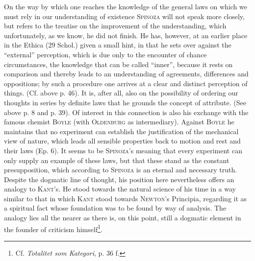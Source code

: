 \documentclass[12pt]{article}
\newcommand{\opage}[1]{\marginnote{\footnotesize\textit{[#1]}}}
\begin{document}
On the way by which one reaches the knowledge of the general laws on which we must rely in
our understanding of existence \textsc{Spinoza} will not speak more closely, but refers to
the treatise on the improvement of the understanding, which unfortunately, as we know, he
did not finish. He has, however, at an earlier place in the Ethica (29 Schol.) given a small
hint, in that he sets over against the ``external'' perception, which is due only to the
encounter of chance circumstances, the knowledge that can be called ``inner'', because it
rests on comparison and thereby leads to an understanding of agreements, differences and
oppositions; by such a procedure one arrives at a clear and distinct perception of things.
(Cf. above p. 46). It is, after all, also on the possibility of ordering our thoughts in
series by definite laws that he grounds the concept of attribute. (See above p. 8 and p.
39). Of interest in this connection is also his exchange with the famous chemist
\textsc{Boyle} (with \textsc{Oldenburg} as intermediary). Against \textsc{Boyle} he
maintains that no experiment can establish the justification of the mechanical view of
nature, which leads all sensible properties back to motion and rest and their laws (Ep. 6).
It seems to be \textsc{Spinoza}'s meaning that every experiment can only supply an example
of these laws, but that these stand as the constant presupposition, which according to
\textsc{Spinoza} is an eternal and necessary truth. Despite the dogmatic line of thought,
his position here nevertheless offers an analogy to \textsc{Kant}'s. He stood towards the
natural science of his time in a way similar to that in which \textsc{Kant} stood towards
\textsc{Newton}'s Principia, regarding \opage{49}it as a spiritual fact whose foundation was
to be found by way of analysis. The analogy lies all the nearer as there is, on this point,
still a dogmatic element in the founder of criticism himself\footnote{Cf.
\textit{Totalitet som Kategori}, p. 36 f.}.
\end{document}
